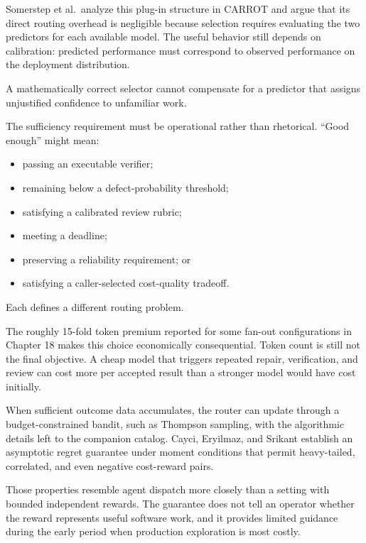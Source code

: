 Somerstep et al.~analyze this plug-in structure in CARROT and argue that its direct routing overhead is negligible because selection requires evaluating the two predictors for each available model. The useful behavior still depends on calibration: predicted performance must correspond to observed performance on the deployment distribution.

A mathematically correct selector cannot compensate for a predictor that assigns unjustified confidence to unfamiliar work.


The sufficiency requirement must be operational rather than rhetorical. ``Good enough'' might mean:

\begin{itemize}
\tightlist
\item
  passing an executable verifier;
\item
  remaining below a defect-probability threshold;
\item
  satisfying a calibrated review rubric;
\item
  meeting a deadline;
\item
  preserving a reliability requirement; or
\item
  satisfying a caller-selected cost-quality tradeoff.
\end{itemize}

Each defines a different routing problem.

The roughly 15-fold token premium reported for some fan-out configurations in Chapter 18 makes this choice economically consequential. Token count is still not the final objective. A cheap model that triggers repeated repair, verification, and review can cost more per accepted result than a stronger model would have cost initially.

When sufficient outcome data accumulates, the router can update through a budget-constrained bandit, such as Thompson sampling, with the algorithmic details left to the companion catalog. Cayci, Eryilmaz, and Srikant establish an asymptotic regret guarantee under moment conditions that permit heavy-tailed, correlated, and even negative cost-reward pairs.

Those properties resemble agent dispatch more closely than a setting with bounded independent rewards. The guarantee does not tell an operator whether the reward represents useful software work, and it provides limited guidance during the early period when production exploration is most costly.

